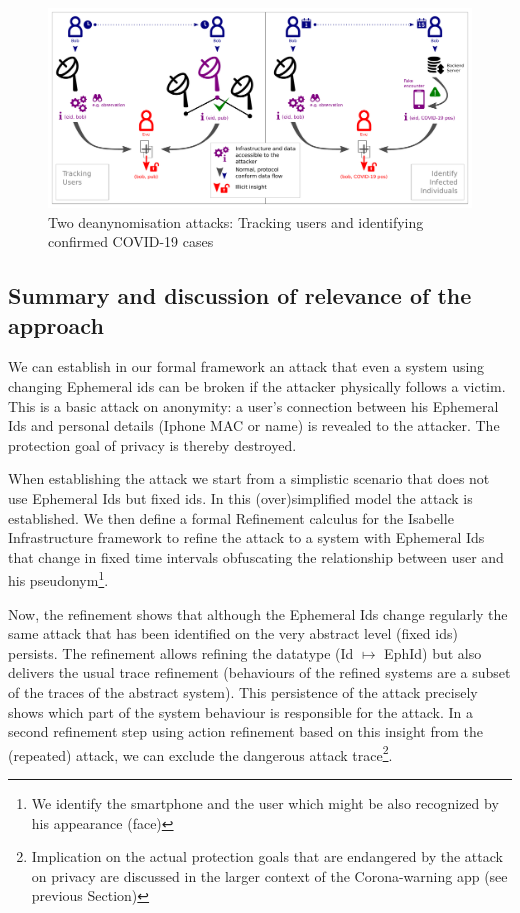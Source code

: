 \documentclass{llncs}
\begin{document}
\begin{figure}[htb]
  \begin{center}
    \includegraphics[width=6in]{DP-3T_deanonymisation_attacks}
  \end{center}
  \caption{Two deanynomisation attacks: Tracking users and identifying confirmed COVID-19 cases}
  \label{fig:dp3tprot}
\end{figure}

\subsection{Summary and discussion of relevance of the approach}
We can establish in our formal framework an attack that even a system using changing
Ephemeral ids can be broken if the attacker physically follows a victim. This is a basic attack on
anonymity: a user's connection between his Ephemeral Ids and personal details (Iphone MAC or name)
is revealed to the attacker. The protection goal of privacy is thereby destroyed.

When establishing the attack we start from a simplistic scenario that does not use Ephemeral Ids but fixed ids.
In this (over)simplified model the attack is established. We then define a formal Refinement calculus for
the Isabelle Infrastructure framework to refine the attack to a system with Ephemeral Ids that change in fixed
time intervals obfuscating the relationship between user and his pseudonym\footnote{We identify the smartphone
  and the user which might be also recognized by his appearance (face)}.

Now, the refinement shows that although the Ephemeral Ids change regularly the same attack that has been
identified on the very abstract level (fixed ids) persists.
The refinement allows refining the datatype (Id $\mapsto$ EphId) but also delivers the usual trace
refinement (behaviours of the refined systems are a subset of the traces of the abstract system).
This persistence of the attack precisely shows which part of the system behaviour is responsible for the
attack. In a second refinement step using action refinement based on this insight from the (repeated)
attack, we can exclude the dangerous attack trace\footnote{Implication on the actual protection goals
  that are endangered by the attack on privacy are discussed in the larger context of the Corona-warning
  app (see previous Section)}.
\end{document}
